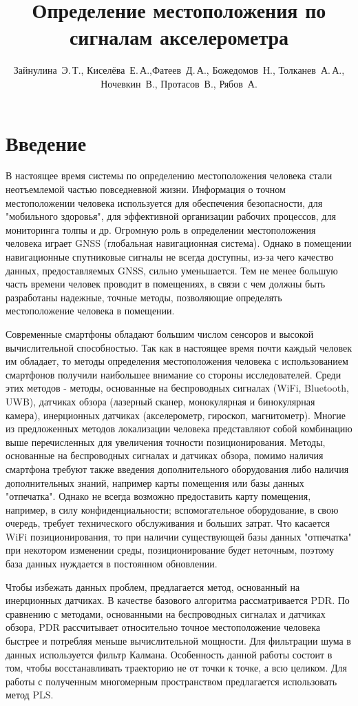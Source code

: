 \documentclass[12pt,twoside]{article}
\title
    [Определение местоположения по сигналам акселерометра] 
    {Определение местоположения по сигналам акселерометра}
\author
    [Зайнулина~Э.\,Т.] %
    {Зайнулина~Э.\,Т., Киселёва~Е.\,А.,Фатеев~Д.\,А.,
    Божедомов~Н., Толканев~А.\,А., Ночевкин~В.,
    Протасов~В., Рябов~А.} %
\begin{document}
\maketitle

\section{Введение}
В настоящее время системы по определению местоположения человека стали неотъемлемой частью повседневной жизни. Информация о точном местоположении человека используется для обеспечения безопасности, для "мобильного здоровья", для эффективной организации рабочих процессов, для мониторинга толпы и др. Огромную роль в определении местоположения человека играет GNSS (глобальная навигационная система). Однако в помещении навигационные спутниковые сигналы не всегда доступны, из-за чего качество данных, предоставляемых GNSS, сильно уменьшается. Тем не менее большую часть времени человек проводит в помещениях, в связи с чем должны быть разработаны надежные, точные методы, позволяющие определять местоположение человека в помещении.

Современные смартфоны обладают большим числом сенсоров и высокой вычислительной способностью. Так как в настоящее время почти каждый человек им обладает, то методы определения местоположения человека с использованием смартфонов получили наибольшее внимание со стороны исследователей. Среди этих методов - методы, основанные на беспроводных сигналах (WiFi, Bluetooth, UWB), датчиках обзора (лазерный сканер, монокулярная и бинокулярная камера), инерционных датчиках (акселерометр, гироскоп, магнитометр). Многие из предложенных методов локализации человека представляют собой комбинацию выше перечисленных для увеличения точности позиционирования. Методы, основанные на беспроводных сигналах и датчиках обзора, помимо наличия смартфона требуют также введения дополнительного оборудования либо наличия дополнительных знаний, например карты помещения или базы данных "отпечатка". Однако не всегда возможно предоставить карту помещения, например, в силу конфиденциальности; вспомогательное оборудование, в свою очередь, требует технического обслуживания и больших затрат. Что касается WiFi позиционирования, то при наличии существующей базы данных "отпечатка" при некотором изменении среды, позиционирование будет неточным, поэтому база данных нуждается в постоянном обновлении.

Чтобы избежать данных проблем, предлагается метод, основанный на инерционных датчиках. В качестве базового алгоритма рассматривается PDR. По сравнению с методами, основанными на беспроводных сигналах и датчиках обзора, PDR рассчитывает относительно точное местоположение человека быстрее и потребляя меньше вычислительной мощности. Для фильтрации шума в данных используется фильтр Калмана. Особенность данной работы состоит в том, чтобы восстанавливать траекторию не от точки к точке, а всю целиком. Для работы с полученным многомерным пространством предлагается использовать метод PLS.

%
%
\end{document}
